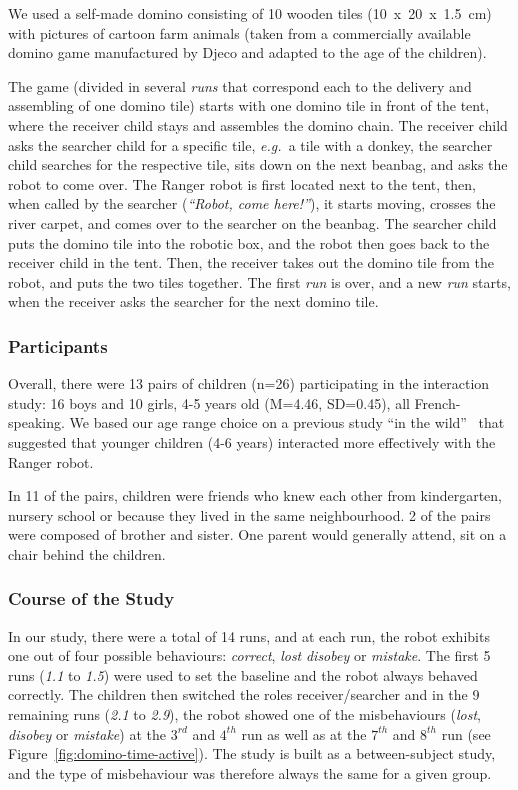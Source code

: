\documentclass{sig-alternate}
\newcommand{\eg}{{\textit{e.g.~}}}
\begin{document}
We used a self-made domino consisting of 10 wooden tiles (10~x~20~x~1.5~cm) with
pictures of cartoon farm animals (taken from a commercially available domino
game manufactured by Djeco and adapted to the age of the children).

The game (divided in several \emph{runs} that correspond each to the delivery
and assembling of one domino tile) starts with one domino tile in front of the
tent, where the receiver child stays and assembles the domino chain. The
receiver child asks the searcher child for a specific tile, \eg a tile with a
donkey, the searcher child searches for the respective tile, sits down on the next
beanbag, and asks the robot to come over.  The Ranger robot is first located
next to the tent, then, when called by the searcher (\textit{``Robot, come
here!''}), it starts moving, crosses the river carpet, and comes over to the
searcher on the beanbag. The searcher child puts the domino tile into the
robotic box, and the robot then goes back to the receiver child in the tent.
Then, the receiver takes out the domino tile from the robot, and puts the two
tiles together. The first \emph{run} is over, and a new \emph{run} starts, when
the receiver asks the searcher for the next domino tile.

\subsubsection{Participants}

Overall, there were 13 pairs of children (n=26) participating in the interaction
study: 16 boys and 10 girls, 4-5 years old (M=4.46, SD=0.45), all
French-speaking. We based our age range choice on a previous study ``in the
wild''~\cite{fink2014which} that suggested that younger children (4-6 years)
interacted more effectively with the Ranger robot.

In 11 of the pairs, children were friends who knew each other
from kindergarten, nursery school or because they lived in the same
neighbourhood. 2 of the pairs were composed of brother and sister. One parent
would generally attend, sit on a chair behind the children.


\subsubsection{Course of the Study}

In our study, there were a total of 14 runs, and at each run, the robot exhibits
one out of four possible behaviours: \emph{correct}, \emph{lost} \emph{disobey}
or \emph{mistake}.  The first 5 runs (\emph{1.1} to \emph{1.5}) were used to set
the baseline and the robot always behaved correctly. The children then switched
the roles receiver/searcher and in the 9 remaining runs (\emph{2.1} to
\emph{2.9}), the robot showed one of the misbehaviours (\emph{lost},
\emph{disobey} or \emph{mistake}) at the $3^{rd}$ and $4^{th}$ run as well as at
the $7^{th}$ and $8^{th}$ run (see Figure~\ref{fig:domino-time-active}). The
study is built as a between-subject study, and the type of misbehaviour was
therefore always the same for a given group.
\end{document}
